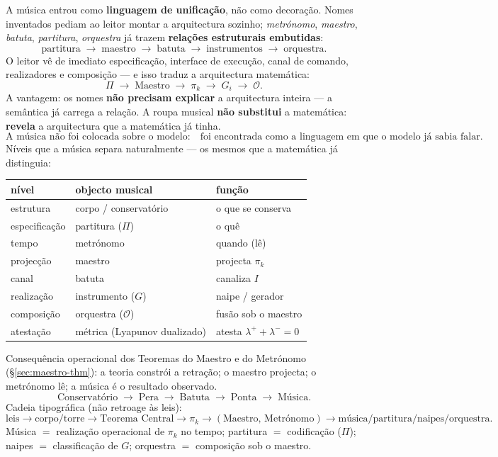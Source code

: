\documentclass[11pt,a4paper]{article}
\begin{document}
A música entrou como \textbf{linguagem de unificação}, não como
decoração. Nomes inventados pediam ao leitor montar a arquitectura
sozinho; \emph{metrónomo}, \emph{maestro}, \emph{batuta},
\emph{partitura}, \emph{orquestra} já trazem \textbf{relações
estruturais embutidas}:
\[
\text{partitura}
\;\rightarrow\;
\text{maestro}
\;\rightarrow\;
\text{batuta}
\;\rightarrow\;
\text{instrumentos}
\;\rightarrow\;
\text{orquestra}.
\]
O leitor vê de imediato especificação, interface de execução, canal de
comando, realizadores e composição --- e isso traduz a arquitectura
matemática:
\[
\Pi
\;\rightarrow\;
\text{Maestro}
\;\rightarrow\;
\pi_k
\;\rightarrow\;
G_i
\;\rightarrow\;
\mathcal{O}.
\]
A vantagem: os nomes \textbf{não precisam explicar} a arquitectura
inteira --- a semântica já carrega a relação. A roupa musical
\textbf{não substitui} a matemática: \textbf{revela} a arquitectura
que a matemática já tinha.
\[
\boxed{
\text{A música não foi colocada sobre o modelo:}
\quad
\text{foi encontrada como a linguagem em que o modelo já sabia falar.}
}
\]
Níveis que a música separa naturalmente --- os mesmos que a matemática
já distinguia:
\begin{center}\small
\begin{tabular}{@{}lll@{}}
nível & objecto musical & função \\
\hline
estrutura & corpo / conservatório & o que se conserva \\
especificação & partitura ($\Pi$) & o quê \\
tempo & metrónomo & quando (lê) \\
projecção & maestro & projecta $\pi_k$ \\
canal & batuta & canaliza $I$ \\
realização & instrumento ($G$) & naipe / gerador \\
composição & orquestra ($\mathcal{O}$) & fusão sob o maestro \\
atestação & métrica (Lyapunov dualizado) & atesta $\lambda^{+}{+}\lambda^{-}=0$ \\
\end{tabular}
\end{center}
Consequência operacional dos Teoremas do Maestro e do Metrónomo
(\S\ref{sec:maestro-thm}): a teoria constrói a retração; o maestro
projecta; o metrónomo lê; a música é o resultado observado.
\[
\boxed{
\text{Conservatório}
\;\to\;
\text{Pera}
\;\to\;
\text{Batuta}
\;\to\;
\text{Ponta}
\;\to\;
\text{Música}.
}
\]
Cadeia tipográfica (não retroage às leis):
\[
\text{leis}\to\text{corpo/torre}\to
\text{Teorema Central}
\to\pi_k\to
(\text{Maestro},\,\text{Metrónomo})
\to\text{música}/\text{partitura}/\text{naipes}/\text{orquestra}.
\]
Música $=$ realização operacional de $\pi_k$ no tempo; partitura $=$
codificação ($\Pi$); naipes $=$ classificação de $G$; orquestra $=$
composição sob o maestro.
\end{document}
